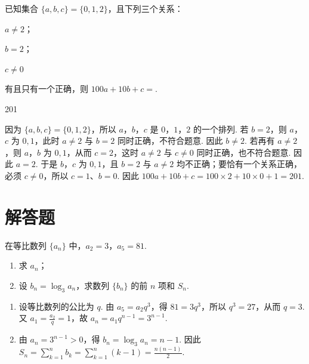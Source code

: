 \begin{problem}
已知集合 \(\{a, b, c\} = \{0, 1, 2\}\)，且下列三个关系：

\begin{circlelist}
\item \(a \neq 2\)；
\item \(b = 2\)；
\item \(c \neq 0\)
\end{circlelist}

有且只有一个正确，则 \(100a + 10b + c =\)\fillinblank{}.

\begin{answer}
201
\end{answer}

\begin{solution}
因为 \(\{a,b,c\}=\{0,1,2\}\)，所以 \(a\)，\(b\)，\(c\) 是 \(0\)，\(1\)，\(2\) 的一个排列. 若 \(b=2\)，则 \(a\)，\(c\) 为 \(0,1\)，此时 \(a\neq2\) 与 \(b=2\) 同时正确，不符合题意. 因此 \(b\neq2\). 若再有 \(a\neq2\)，则 \(a\)，\(b\) 为 \(0,1\)，从而 \(c=2\)，这时 \(a\neq2\) 与 \(c\neq0\) 同时正确，也不符合题意. 因此 \(a=2\). 于是 \(b\)，\(c\) 为 \(0,1\)，且 \(b=2\) 与 \(a\neq2\) 均不正确；要恰有一个关系正确，必须 \(c\neq0\)，所以 \(c=1\)、\(b=0\). 因此 \(100a+10b+c=100\times2+10\times0+1=201\).
\end{solution}
\end{problem}

\section{解答题}

\begin{problem}
在等比数列 \(\{a_n\}\) 中，\(a_2 = 3\)，\(a_5 = 81\).

\begin{enumerate}
\item 求 \(a_n\)；
\item 设 \(b_n = \log_{3} a_n\)，求数列 \(\{b_n\}\) 的前 \(n\) 项和 \(S_n\).
\end{enumerate}

\begin{solution}
\begin{enumerate}
\item 设等比数列的公比为 \(q\). 由 \(a_5=a_2q^3\)，得 \(81=3q^3\)，所以 \(q^3=27\)，从而 \(q=3\). 又 \(a_1=\frac{a_2}{q}=1\)，故 \(a_n=a_1q^{n-1}=3^{n-1}\).
\item 由 \(a_n=3^{n-1}>0\)，得 \(b_n=\log_3a_n=n-1\). 因此 \(S_n=\sum_{k=1}^{n}b_k=\sum_{k=1}^{n}(k-1)=\frac{n(n-1)}{2}\).
\end{enumerate}
\end{solution}
\end{problem}

